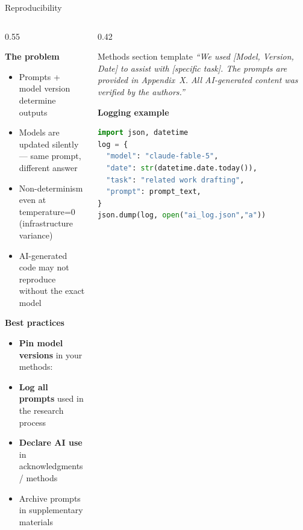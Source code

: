 \begin{frame}[fragile]{Reproducibility}
  \begin{columns}[T, onlytextwidth]
    \begin{column}{0.55\textwidth}
      {\small
      \textbf{The problem}\\[0.2em]
      \begin{itemize}
        \item Prompts + model version determine outputs
        \item Models are updated silently — same prompt, different answer
        \item Non-determinism even at temperature=0 (infrastructure variance)
        \item AI-generated code may not reproduce without the exact model
      \end{itemize}
      \vspace{0.3em}
      \textbf{Best practices}~\parencite{pineau2021reproducibility}\\[0.2em]
      \begin{itemize}
        \item \textbf{Pin model versions} in your methods: 
        \item \textbf{Log all prompts} used in the research process
        \item \textbf{Declare AI use} in acknowledgments / methods
        \item Archive prompts in supplementary materials
      \end{itemize}}
    \end{column}
    \hfill
    \begin{column}{0.42\textwidth}
      \begin{block}{Methods section template}
        \small \textit{``We used [Model, Version, Date] to assist with [specific task]. The prompts are provided in Appendix~X. All AI-generated content was verified by the authors.''}
      \end{block}
      \vspace{0.3em}
      \textbf{Logging example}\\[0.2em]
      \begin{lstlisting}[language=python, numbers=none, basicstyle=\ttfamily\scriptsize]
import json, datetime
log = {
  "model": "claude-fable-5",
  "date": str(datetime.date.today()),
  "task": "related work drafting",
  "prompt": prompt_text,
}
json.dump(log, open("ai_log.json","a"))
      \end{lstlisting}
    \end{column}
  \end{columns}
\end{frame}

